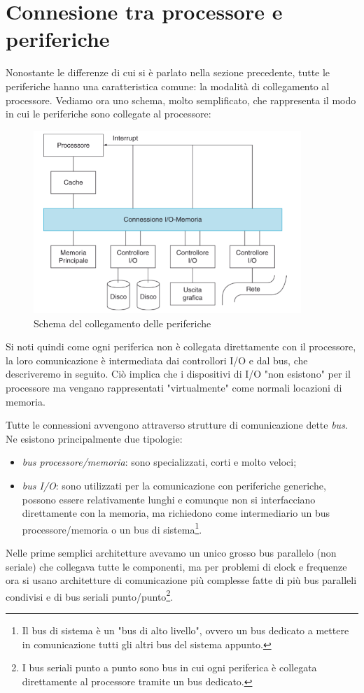 \documentclass[class=book, crop=false, oneside]{standalone}
\begin{document}
\section{Connesione tra processore e periferiche}
Nonostante le differenze di cui si è parlato nella sezione precedente, tutte le periferiche hanno una caratteristica comune: la modalità di collegamento al processore. Vediamo ora uno schema, molto semplificato, che rappresenta il modo in cui le periferiche sono collegate al processore:
\begin{figure}[!h]
	\centering
	\includegraphics[width=0.9\textwidth,keepaspectratio]{schema-periferiche}
	\caption{Schema del collegamento delle periferiche}
\end{figure}
Si noti quindi come ogni periferica non è collegata direttamente con il processore, la loro comunicazione è intermediata dai controllori I/O e dal bus, che descriveremo in seguito.
Ciò implica che i dispositivi di I/O "non esistono" per il processore ma vengano rappresentati "virtualmente" come normali locazioni di memoria.

Tutte le connessioni avvengono attraverso strutture di comunicazione dette \emph{bus}. Ne esistono principalmente due tipologie:
\begin{itemize}
	\item \emph{bus processore/memoria}: sono specializzati, corti e molto veloci;
	\item \emph{bus I/O}: sono utilizzati per la comunicazione con periferiche generiche, possono essere relativamente lunghi e comunque non si interfacciano direttamente con la memoria, ma richiedono come intermediario un bus processore/memoria o un bus di sistema\footnote{Il bus di sistema è un "bus di alto livello", ovvero un bus dedicato a  mettere in comunicazione tutti gli altri bus del sistema appunto.}.
\end{itemize}
Nelle prime semplici architetture avevamo un unico grosso bus parallelo (non seriale) che collegava tutte le componenti, ma per problemi di clock e frequenze ora si usano architetture di comunicazione più complesse fatte di più bus paralleli condivisi e di bus seriali punto/punto\footnote{I bus seriali punto a punto sono bus in cui ogni periferica è collegata direttamente al processore tramite un bus dedicato.}.
\end{document}
